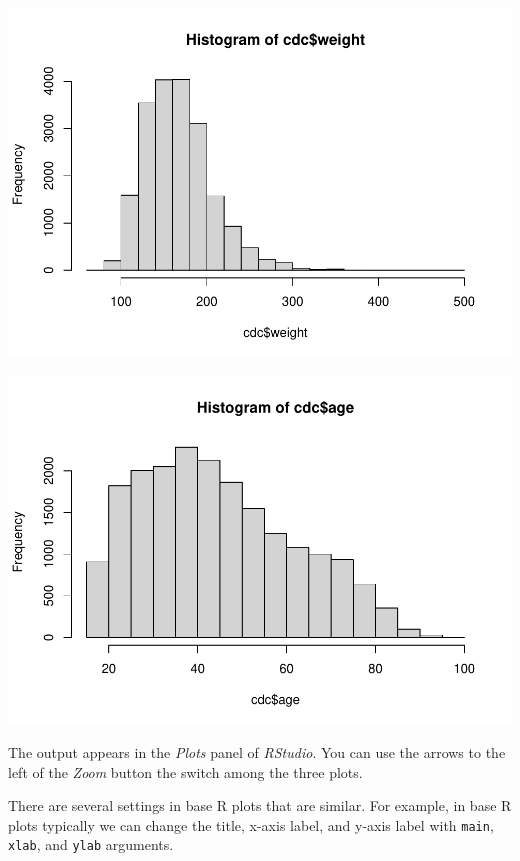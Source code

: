 \documentclass[
]{book}
\newenvironment{Shaded}{\begin{snugshade}}{\end{snugshade}}
\newcommand{\KeywordTok}[1]{\textcolor[rgb]{0.13,0.29,0.53}{\textbf{#1}}}
\newcommand{\NormalTok}[1]{#1}
\newcommand{\OperatorTok}[1]{\textcolor[rgb]{0.81,0.36,0.00}{\textbf{#1}}}
\begin{document}
\includegraphics{_main_files/figure-latex/unnamed-chunk-223-2.pdf}

\begin{Shaded}
\end{Shaded}

\includegraphics{_main_files/figure-latex/unnamed-chunk-223-3.pdf}

The output appears in the \emph{Plots} panel of \emph{RStudio}. You can use the arrows to the left of the \emph{Zoom} button the switch among the three plots.

There are several settings in base R plots that are similar. For example, in base R plots typically we can change the title, x-axis label, and y-axis label with \texttt{main}, \texttt{xlab}, and \texttt{ylab} arguments.
\end{document}
